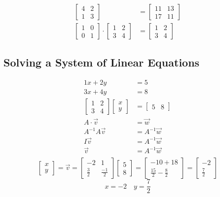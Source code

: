 \documentclass[letterpaper, 12pt]{math}
\begin{document}
\begin{align*}
\begin{bmatrix}
    4 & 2 \\
    1 & 3
  \end{bmatrix}&=
  \begin{bmatrix}
    11 & 13 \\
    17 & 11
  \end{bmatrix}\\
  \begin{bmatrix}
    1 & 0 \\
    0 & 1
  \end{bmatrix}\cdot
  \begin{bmatrix}
    1 & 2 \\
    3 & 4
  \end{bmatrix}&=
  \begin{bmatrix}
    1 & 2 \\
    3 & 4
  \end{bmatrix}
\end{align*}

\subsection*{Solving a System of Linear Equations}
\begin{align*}
  1x+2y &= 5 \\
  3x+4y &= 8 \\
  \begin{bmatrix} 1 & 2 \\ 3 & 4 \end{bmatrix}
  \begin{bmatrix} x \\ y \end{bmatrix} &= \begin{bmatrix} 5 & 8 \end{bmatrix} \\
  A\cdot\vec{v} &= \vec{w} \\
  A^{-1}A\vec{v} &= A^{-1}\vec{w} \\
  I\vec{v} &= A^{-1}\vec{w} \\
  \vec{v} &= A^{-1}\vec{w} \\
\end{align*}
\[ \begin{bmatrix} x \\ y \end{bmatrix} = \vec{v} =
   \begin{bmatrix} -2 & 1 \\ \frac{3}{2} & \frac{-1}{2} \end{bmatrix}
   \begin{bmatrix} 5 \\ 8 \end{bmatrix} =
   \begin{bmatrix} -10+18 \\ \frac{15}{2}-\frac{8}{2} \end{bmatrix} =
   \begin{bmatrix} -2 \\ \frac{7}{2} \end{bmatrix}
\]
\[ x = -2 \quad y = \frac{7}{2} \]
\end{document}
